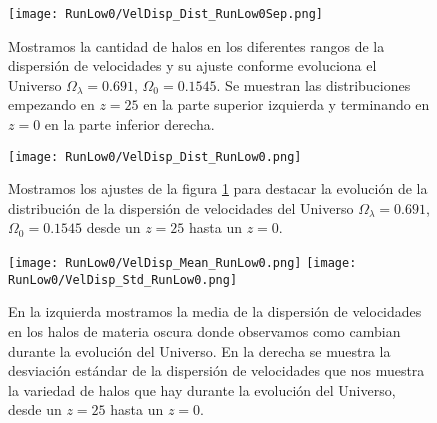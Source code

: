 \begin{figure}[H]
    \centering
    \texttt{[image: RunLow0/VelDisp\_Dist\_RunLow0Sep.png]}
    \caption[Dispersión de velocidades]{\footnotesize Mostramos la cantidad de halos en los diferentes rangos de la dispersión de velocidades y su ajuste conforme evoluciona el Universo $\Omega_\lambda = 0.691$, $\Omega_0 = 0.1545$. Se muestran las distribuciones empezando en $z=25$ en la parte superior izquierda y terminando en $z=0$ en la parte inferior derecha.}
    \label{fig:Low0-VelDispDistSep}
\end{figure}

\begin{figure}[H]
    \centering
    \texttt{[image: RunLow0/VelDisp\_Dist\_RunLow0.png]}
    \caption[Distribución de la dispersión de velocidades]{\footnotesize Mostramos los ajustes de la figura \ref{fig:Low0-VelDispDistSep} para destacar la evolución de la distribución de la dispersión de velocidades del Universo $\Omega_\lambda = 0.691$, $\Omega_0 = 0.1545$ desde un $z=25$ hasta un $z=0$.}
    \label{fig:Low0-VelDispDist}
\end{figure}

\begin{figure}[H]
    \centering
    \texttt{[image: RunLow0/VelDisp\_Mean\_RunLow0.png]}
    \texttt{[image: RunLow0/VelDisp\_Std\_RunLow0.png]}
    \caption[Media y desviación estándar de la dispersión de velocidades]{\footnotesize En la izquierda mostramos la media de la dispersión de velocidades en los halos de materia oscura donde observamos como cambian durante la evolución del Universo. En la derecha se muestra la desviación estándar de la dispersión de velocidades que nos muestra la variedad de halos que hay durante la evolución del Universo, desde un $z=25$ hasta un $z=0$.}
    \label{fig:Low0-VelDispStats}
\end{figure}

